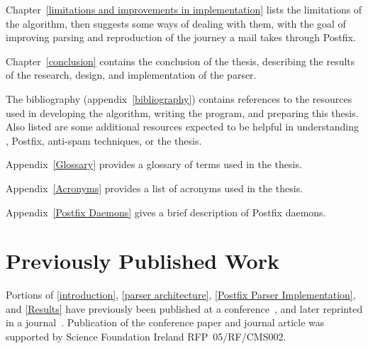 Chapter~\ref{limitations and improvements in implementation} lists the
limitations of the algorithm, then suggests some ways of dealing with them,
with the goal of improving parsing and reproduction of the journey a mail
takes through Postfix.

Chapter~\ref{conclusion} contains the conclusion of the thesis, describing
the results of the research, design, and implementation of the parser.

The bibliography (appendix~\ref{bibliography}) contains references to the
resources used in developing the algorithm, writing the program, and
preparing this thesis.  Also listed are some additional resources expected
to be helpful in understanding , Postfix, anti-spam
techniques, or the thesis.

Appendix~\ref{Glossary} provides a glossary of terms used in the thesis.

Appendix~\ref{Acronyms} provides a list of acronyms used in the thesis.

Appendix~\ref{Postfix Daemons} gives a brief description of Postfix
daemons.

\section{Previously Published Work}

Portions of \textsection\ref{introduction}, \textsection\ref{parser
architecture}, \textsection\ref{Postfix Parser Implementation}, and
\textsection\ref{Results} have previously been published at a
conference~\cite{sgai-2008}, and later reprinted in a
journal~\cite{elsevier-2009}.  Publication of the conference paper and
journal article was supported by Science Foundation Ireland
RFP~05/RF/CMS002.
